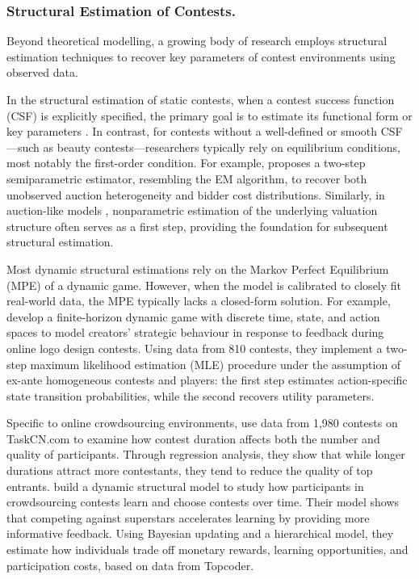 \documentclass[mnsc]{informs3}
\begin{document}
\subsubsection{Structural Estimation of Contests.}

Beyond theoretical modelling, a growing body of research employs structural estimation techniques to recover key parameters of contest environments using observed data.

In the structural estimation of static contests, when a contest success function (CSF) is explicitly specified, the primary goal is to estimate its functional form or key parameters \citep{hwang2012technology, kang2016policy, huang2021structural}.
In contrast, for contests without a well-defined or smooth CSF—such as beauty contests—researchers typically rely on equilibrium conditions, most notably the first-order condition.
For example, \citet{yoganarasimhan2016estimation} proposes a two-step semiparametric estimator, resembling the EM algorithm, to recover both unobserved auction heterogeneity and bidder cost distributions.
Similarly, in auction-like models \citep{guerre2000optimal, shakhgildyan2022nonparametric}, nonparametric estimation of the underlying valuation structure often serves as a first step, providing the foundation for subsequent structural estimation.

Most dynamic structural estimations rely on the Markov Perfect Equilibrium (MPE) of a dynamic game. 
However, when the model is calibrated to closely fit real-world data, the MPE typically lacks a closed-form solution.
For example, \citet{jiang2022feedback} develop a finite-horizon dynamic game with discrete time, state, and action spaces to model creators’ strategic behaviour in response to feedback during online logo design contests.
Using data from 810 contests, they implement a two-step maximum likelihood estimation (MLE) procedure under the assumption of ex-ante homogeneous contests and players: the first step estimates action-specific state transition probabilities, while the second recovers utility parameters.

Specific to online crowdsourcing environments, 
\citet{chen2021attracting} use data from 1,980 contests on TaskCN.com to examine how contest duration affects both the number and quality of participants.
Through regression analysis, they show that while longer durations attract more contestants, they tend to reduce the quality of top entrants.
\citet{zhang2019structural} build a dynamic structural model to study how participants in crowdsourcing contests learn and choose contests over time.
Their model shows that competing against superstars accelerates learning by providing more informative feedback.
Using Bayesian updating and a hierarchical model, they estimate how individuals trade off monetary rewards, learning opportunities, and participation costs, based on data from Topcoder.
\end{document}
